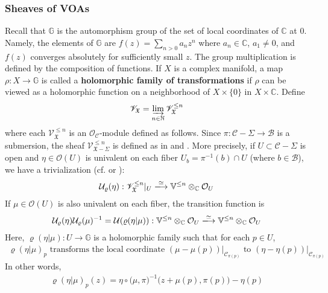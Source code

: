 \documentclass[11pt,b5paper,notitlepage]{article}
\theoremstyle{definition}
\theoremstyle{plain}
\newcommand{\fk}{\mathfrak}
\newcommand{\mc}{\mathcal}
\newcommand{\scr}{\mathscr}
\newcommand{\Vbb}{\mathbb V}
\newcommand{\Gbb}{\mathbb G}
\newcommand{\Cbb}{\mathbb C}
\newcommand{\Nbb}{\mathbb N}
\newcommand{\<}{\left\langle}
\renewcommand{\>}{\right\rangle}
\newcommand{\MC}{\mathcal{C}}
\newcommand{\MB}{\mathcal{B}}
\newcommand{\fx}{\mathfrak{X}}
\numberwithin{equation}{subsection}
\begin{document}
\subsubsection{Sheaves of VOAs}\label{mc2}
Recall that $\Gbb$ is the automorphism group of the set of local coordinates of $\Cbb$ at $0$. Namely, the elements of $\Gbb$ are $f(z)=\sum_{n>0}a_nz^n$ where $a_n\in\Cbb$, $a_1\neq0$, and $f(z)$ converges absolutely for sufficiently small $z$. The group multiplication is defined by the composition of functions. If $X$ is a complex manifold, a map $\rho:X\rightarrow\Gbb$ is called a \textbf{holomorphic family of transformations} if $\rho$ can be viewed as a holomorphic function on a neighborhood of $X\times\{0\}$ in $X\times\Cbb$.  Define
\begin{align*}
\scr V_{\fk X}=\varinjlim_{n\in\Nbb}\scr V_{\fk X}^{\leq n}
\end{align*}
where each $\scr V_{\fk X}^{\leq n}$ is an $\mc O_{\mc C}$-module  defined as follows. Since $\pi:\mc C-\Sigma\rightarrow\mc B$ is a submersion, the sheaf $\scr V_{\fk X-\Sigma}^{\leq n}$ is defined as in \cite[Sec. 5]{Gui-sewingconvergence} and \cite[Sec. 1.6]{GZ1}. %
More precisely, if $U\subset\MC-\Sigma$ is open and $\eta\in\mc O(U)$ is univalent on each fiber $U_b=\pi^{-1}(b)\cap U$ (where $b\in\MB$), we have a trivialization (cf. \cite[Eq. (2.5)]{Gui-sewingconvergence} or \cite[Sec. 1.6]{GZ1}):
\begin{gather}\label{eq175}
\mc U_\varrho(\eta):\scr V^{\leq n}_\fx|_U\xlongrightarrow{\simeq}\Vbb^{\leq n}\otimes_\Cbb\mc O_U
\end{gather}
If $\mu\in\mc O(U)$ is also univalent on each fiber, the transition function is
\begin{align}\label{eqb22}
\mc U_\varrho(\eta)\mc U_\varrho(\mu)^{-1}=\mc U(\varrho(\eta|\mu)):\Vbb^{\leq n}\otimes_\Cbb\mc O_U\xlongrightarrow{\simeq}\Vbb^{\leq n}\otimes_\Cbb\mc O_U
\end{align}
Here, $\varrho(\eta|\mu):U\rightarrow\Gbb$ is a holomorphic family such that for each $p\in U$,  
\begin{align}\label{eqb39}
\text{$\varrho(\eta|\mu)_p$ transforms the local coordinate $(\mu-\mu(p))|_{\mc C_{\pi(p)}}$ to $(\eta-\eta(p))|_{\mc C_{\pi(p)}}$}
\end{align}
In other words,
\begin{align}\label{eqb40}
\varrho(\eta|\mu)_p(z)=\eta\circ\big(\mu,\pi)^{-1}(z+\mu(p),\pi(p)\big)-\eta(p)
\end{align}
\end{document}
